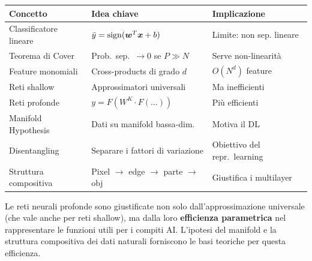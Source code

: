 \begin{center}
\begin{tabular}{lll}
  \toprule
  \textbf{Concetto} & \textbf{Idea chiave} & \textbf{Implicazione} \\
  \midrule
  Classificatore lineare & $\bar{y}=\operatorname{sign}(\boldsymbol{w}^T\boldsymbol{x}+b)$ & Limite: non sep. lineare \\
  Teorema di Cover       & Prob.\ sep.\ $\to 0$ se $P \gg N$      & Serve non-linearità \\
  Feature monomiali      & Cross-products di grado $d$             & $O(N^d)$ feature \\
  Reti shallow           & Approssimatori universali               & Ma inefficienti \\
  Reti profonde          & $y = F(W^K \cdot F(\ldots))$           & Più efficienti \\
  Manifold Hypothesis    & Dati su manifold bassa-dim.             & Motiva il DL \\
  Disentangling          & Separare i fattori di variazione        & Obiettivo del repr.\ learning \\
  Struttura compositiva  & Pixel $\to$ edge $\to$ parte $\to$ obj & Giustifica i multilayer \\
  \bottomrule
\end{tabular}
\end{center}

Le reti neurali profonde sono giustificate non solo dall'approssimazione
universale (che vale anche per reti shallow), ma dalla loro
\textbf{efficienza parametrica} nel rappresentare le funzioni utili per i
compiti AI. L'ipotesi del manifold e la struttura compositiva dei dati
naturali forniscono le basi teoriche per questa efficienza.
